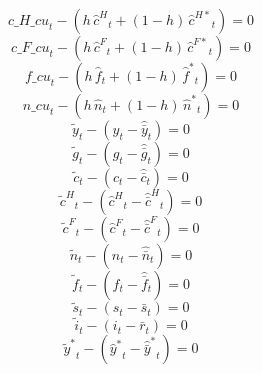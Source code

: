 \begin{dmath}
{c\_H\_cu}_{t}-\left({{h}}\, {{\hat c^H}}_{t}+\left(1-{{h}}\right)\, {{\hat c^{H*}}}_{t}\right)=0
\end{dmath}
\begin{dmath}
{c\_F\_cu}_{t}-\left({{h}}\, {{\hat c^F}}_{t}+\left(1-{{h}}\right)\, {{\hat c^{F*}}}_{t}\right)=0
\end{dmath}
\begin{dmath}
{f\_cu}_{t}-\left({{h}}\, {{\hat f}}_{t}+\left(1-{{h}}\right)\, {{\hat f^*}}_{t}\right)=0
\end{dmath}
\begin{dmath}
{n\_cu}_{t}-\left({{h}}\, {{\hat n}}_{t}+\left(1-{{h}}\right)\, {{\hat n^*}}_{t}\right)=0
\end{dmath}
\begin{dmath}
{{\tilde y}}_{t}-\left({{\hat y}}_{t}-{{\hat {\bar y}}}_{t}\right)=0
\end{dmath}
\begin{dmath}
{{\tilde g}}_{t}-\left({{\hat g}}_{t}-{{\hat {\bar g}}}_{t}\right)=0
\end{dmath}
\begin{dmath}
{{\tilde c}}_{t}-\left({{\hat c}}_{t}-{{\hat {\bar c}}}_{t}\right)=0
\end{dmath}
\begin{dmath}
{{\tilde c^H}}_{t}-\left({{\hat c^H}}_{t}-{{\hat {\bar c}^H}}_{t}\right)=0
\end{dmath}
\begin{dmath}
{{\tilde c^F}}_{t}-\left({{\hat c^F}}_{t}-{{\hat {\bar c}^F}}_{t}\right)=0
\end{dmath}
\begin{dmath}
{{\tilde n}}_{t}-\left({{\hat n}}_{t}-{{\hat {\bar n}}}_{t}\right)=0
\end{dmath}
\begin{dmath}
{{\tilde f}}_{t}-\left({{\hat f}}_{t}-{{\hat {\bar f}}}_{t}\right)=0
\end{dmath}
\begin{dmath}
{{\tilde s}}_{t}-\left({{s}}_{t}-{{\bar s}}_{t}\right)=0
\end{dmath}
\begin{dmath}
{{\tilde i}}_{t}-\left({{i}}_{t}-{{\bar r}}_{t}\right)=0
\end{dmath}
\begin{dmath}
{{\tilde y^*}}_{t}-\left({{\hat y^*}}_{t}-{{\hat {\bar y}^*}}_{t}\right)=0
\end{dmath}
